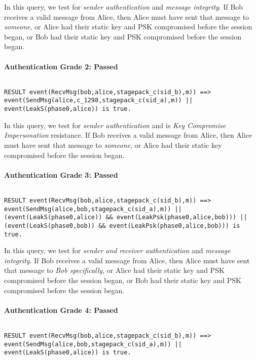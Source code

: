 In this query, we test for \emph{sender authentication} and \emph{message integrity}. If Bob receives a valid message from Alice, then Alice must have sent that message to \emph{someone}, or Alice had their static key and PSK compromised before the session began, or Bob had their static key and PSK compromised before the session began.


\paragraph{Authentication Grade 2: Passed}$ $
\begin{lstlisting}
RESULT event(RecvMsg(bob,alice,stagepack_c(sid_b),m)) ==> event(SendMsg(alice,c_1298,stagepack_c(sid_a),m)) || event(LeakS(phase0,alice)) is true.
\end{lstlisting}

In this query, we test for \emph{sender authentication} and is \emph{Key Compromise Impersonation} resistance. If Bob receives a valid message from Alice, then Alice must have sent that message to \emph{someone}, or Alice had their static key compromised before the session began.


\paragraph{Authentication Grade 3: Passed}$ $
\begin{lstlisting}
RESULT event(RecvMsg(bob,alice,stagepack_c(sid_b),m)) ==> event(SendMsg(alice,bob,stagepack_c(sid_a),m)) || (event(LeakS(phase0,alice)) && event(LeakPsk(phase0,alice,bob))) || (event(LeakS(phase0,bob)) && event(LeakPsk(phase0,alice,bob))) is true.
\end{lstlisting}

In this query, we test for \emph{sender and receiver authentication} and \emph{message integrity}. If Bob receives a valid message from Alice, then Alice must have sent that message to \emph{Bob specifically}, or Alice had their static key and PSK compromised before the session began, or Bob had their static key and PSK compromised before the session began.


\paragraph{Authentication Grade 4: Passed}$ $
\begin{lstlisting}
RESULT event(RecvMsg(bob,alice,stagepack_c(sid_b),m)) ==> event(SendMsg(alice,bob,stagepack_c(sid_a),m)) || event(LeakS(phase0,alice)) is true.
\end{lstlisting}

